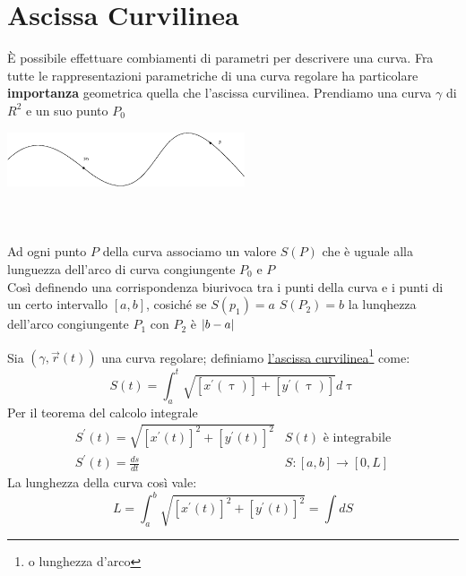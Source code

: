 \section{Ascissa Curvilinea}
È possibile effettuare combiamenti di parametri per descrivere una curva. Fra
tutte le rappresentazioni parametriche di una curva regolare ha particolare
\textbf{importanza} geometrica quella che {\color{red}l'ascissa curvilinea}.
Prendiamo una curva $\gamma$ di $R^2$ e un suo punto $P_0$
\begin{multicols}{2}
	\includegraphics[width=7cm]{img/finiti/ascissa_curvilinea.eps}\\\\\\\\
	Ad ogni punto $P$ della curva associamo un valore $S(P)$ che è uguale
	alla lunguezza dell'arco di curva congiungente $P_0$ e $P$\\
	Così definendo una corrispondenza biurivoca tra i punti della curva e i
	punti di un certo intervallo $[a,b]$, cosiché se $S(p_1)=a$ $S(P_2)=b$ la
	lunqhezza dell'arco congiungente $P_1$ con $P_2$ è $\lvert b-a\rvert$
\end{multicols}
Sia $(\gamma,\vec{r}(t))$ una curva regolare; definiamo \underline{l'ascissa
curvilinea}\footnote{o lunghezza d'arco} come:
\begin{equation*}
	S(t)= \int_{a}^{t}\sqrt{[x^\prime (\uptau)]+[y^\prime(\uptau)]} d\uptau
\end{equation*}
Per il teorema del calcolo integrale
\begin{equation*}
	\begin{matrix}
		S^\prime(t)=\sqrt{[x^\prime(t)]^2+[y^\prime(t)]^2} & S(t) \text{ è
		integrabile}\\
		S^\prime(t)=\frac{ds}{dt} & S:[a,b]\to [0,L]
	\end{matrix}
\end{equation*}
La lunghezza della curva così vale:
\begin{equation}
	L=\int_{a}^{b}\sqrt{[x^\prime(t)]^2+[y^\prime(t)]^2}=\int dS
\end{equation}
